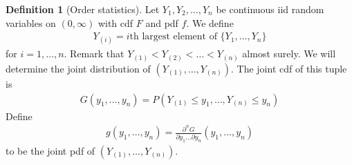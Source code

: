 \documentclass[11pt]{amsart}
\theoremstyle{definition}
\newtheorem{definition}[theorem]{Definition}
\numberwithin{equation}{section}
\begin{document}
 \begin{definition}[Order statistics]
     Let $Y_1,Y_2,\ldots,Y_n$ be continuous iid random variables on $(0,\infty)$ with cdf $F$ and pdf $f$. We define
     \begin{align*}
         Y_{(i)}=i\text{th largest element of }\{Y_1,\ldots,Y_n\}
     \end{align*}
     for $i=1,\ldots,n$. Remark that $Y_{(1)}<Y_{(2)}<\ldots<Y_{(n)}$ almost surely. We will determine the joint distribution of $(Y_{(1)},\ldots,Y_{(n)})$. The joint cdf of this tuple is
     \begin{align*}
         G(y_1,\ldots,y_n)=P(Y_{(1)}\le y_1,\ldots,Y_{(n)}\le y_n)
     \end{align*}
     Define
     \begin{align*}
         g(y_1,\ldots,y_n)=\frac{\partial^n G}{\partial y_1\ldots\partial y_n}(y_1,\ldots,y_n)
     \end{align*}
     to be the joint pdf of $(Y_{(1)},\ldots,Y_{(n)})$.
 \end{definition}
\end{document}
